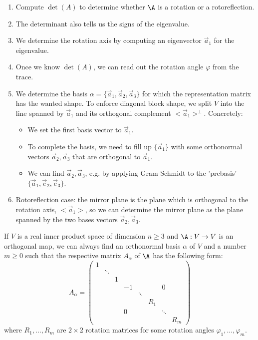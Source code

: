 \begin{remark}[Takeaway]
    \begin{enumerate}
        \item Compute $\det(A)$ to determine whether $\A$ is a rotation or a rotoreflection.
        \item The determinant also tells us the signs of the eigenvalue.
        \item We determine the rotation axis by computing an eigenvector $\vec{a}_1$ for the eigenvalue.
        \item Once we know $\det(A)$, we can read out the rotation angle $\varphi$ from the trace.
        \item We determine the basis $\alpha = \{\vec{a}_1,\vec{a}_2,\vec{a}_3\}$ for which the representation matrix
            has the wanted shape. To enforce diagonal block shape, we split $V$ into the line spanned by $\vec{a}_1$ and
            its orthogonal complement $<\vec{a}_1>^\perp$. Concretely:
            \begin{itemize}
                \item We set the first basis vector to $\vec{a}_1$.
                \item To complete the basis, we need to fill up $\{\vec{a}_1\}$ with some orthonormal vectors $\vec{a}_2, \vec{a}_3$
                    that are orthogonal to $\vec{a}_1$.
                \item We can find $\vec{a}_2, \vec{a}_3$, e.g. by applying Gram-Schmidt to the 'prebasis' $\{\vec{a}_1, \vec{e}_2, \vec{e}_3\}$.
            \end{itemize}
        \item Rotoreflection case: the mirror plane is the plane which is orthogonal to the rotation axis, $<\vec{a}_1>$,
            so we can determine the mirror plane as the plane spanned by the two bases vectors $\vec{a}_2, \vec{a}_3$.
    \end{enumerate}
\end{remark}

\begin{theorem}
    If $V$ is a real inner product space of dimension $n \ge 3$ and $\A:V \to V$ is an orthogonal map, we can always
    find an orthonormal basis $\alpha$ of $V$ and a number $m \ge 0$ such that the respective matrix $A_\alpha$ of $\A$
    has the following form:
    $$A_\alpha = \begin{pmatrix}
        1 & \\
          & \ddots \\
          & & 1 \\
          & & & -1 & & & 0\\
          & & & & \ddots \\
          & & & & & R_1 \\
          & & & 0 & & & \ddots \\
          & & & & & & & R_m
    \end{pmatrix}$$
    where $R_1, \dots, R_m$ are $2 \times 2$ rotation matrices for some rotation angles $\varphi_1, \dots, \varphi_m$.
\end{theorem}

